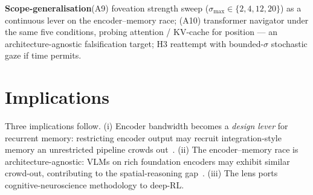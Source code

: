\documentclass[10pt,conference,compsocconf]{IEEEtran}
\begin{document}
\textbf{Scope-generalisation}\quad (A9) foveation strength sweep ($\sigma_{\max} \in \{2,4,12,20\}$) as a continuous lever on the encoder--memory race; (A10) transformer navigator under the same five conditions, probing attention / KV-cache for position --- an architecture-agnostic falsification target; H3 reattempt with bounded-$\sigma$ stochastic gaze if time permits.

\section{Implications}

Three implications follow. (i) Encoder bandwidth becomes a \emph{design lever} for recurrent memory: restricting encoder output may recruit integration-style memory an unrestricted pipeline crowds out~\cite{pourrahimi2025foveated}. (ii) The encoder--memory race is architecture-agnostic: VLMs on rich foundation encoders may exhibit similar crowd-out, contributing to the spatial-reasoning gap~\cite{ramakrishnan2025space}. (iii) The lens ports cognitive-neuroscience methodology to deep-RL.



\end{document}
